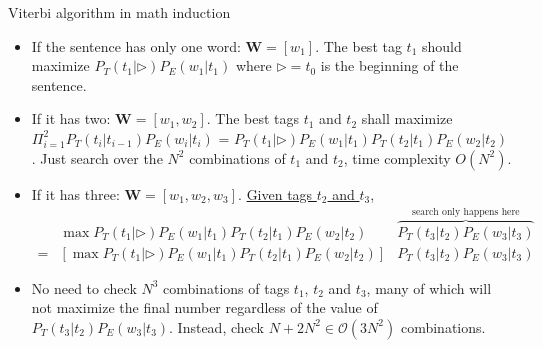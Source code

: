 \documentclass[11pt, handout]{beamer}
\newcommand{\argmaxF}{\mathop{\mathrm{argmax}}\limits}
\begin{document}
\begin{frame}{Viterbi algorithm in math induction}
  \begin{itemize}[<+->]
    \item If the sentence has only one word: $\mathbf{W}= [w_1]$. The best tag  $t_1$ should  maximize $P_T(t_1|\rhd) P_E(w_1|t_1)$ where $\rhd=t_0$ is the beginning of the sentence. 
     \item If it has two: $\mathbf{W}= [w_1, w_2]$.  The best tags $t_1$ and $t_2$ shall maximize 
      $\Pi_{i=1}^{2} P_T(t_i|t_{i-1}) P_E(w_i|t_i)$ = $P_T(t_1|\rhd) P_E(w_1|t_1)  P_T(t_2|t_1) P_E(w_2|t_2)$. Just search over the $N^2$ combinations of $t_1$ and $t_2$, time complexity $O(N^2)$.
    \item If it has three: $\mathbf{W}= [w_1, w_2, w_3]$. \underline{Given tags $t_2$ and  $t_3$}, 
    \begin{align*}
    &  \max P_T(t_1|\rhd) P_E(w_1| t_1) P_T(t_2|t_1) P_E(w_2| t_2) & \overbrace{P_T(t_3|t_2) P_E(w_3| t_3)}^{\text{search only happens here}} \\
    = &  \left [   \max P_T(t_1|\rhd) P_E(w_1| t_1) P_T(t_2|t_1) P_E(w_2| t_2)  \right ]  & P_T(t_3|t_2) P_E(w_3| t_3)
    \end{align*}
    \item %
     No need to check $N^3$ combinations of tags $t_1$, $t_2$ and $t_3$, many of which will not maximize the final number regardless of the value of $P_T(t_3|t_2) P_E(w_3| t_3)$. Instead, check $N + 2N^2 \in \mathcal{O}(3N^2)$ combinations. 
  \end{itemize}
\end{frame}
\end{document}
